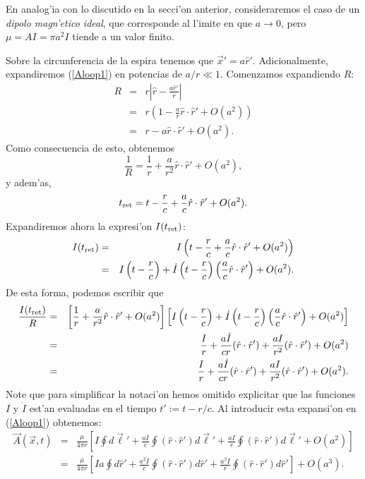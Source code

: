En analog'ia con lo discutido en la secci'on anterior, consideraremos el caso de un \textit{dipolo magn'etico ideal}, que corresponde al l'imite en que $a\to 0$, pero $\mu=AI=\pi a^2I$ tiende a un valor finito.

Sobre la circunferencia de la espira tenemos que $\vec{x}'=a\hat{r}'$. Adicionalmente, expandiremos (\ref{Aloop1}) en potencias de $a/r\ll 1$.  Comenzamos expandiendo $R$:
\begin{eqnarray}
 R&=&r\left|\hat{r}-\frac{a\hat{r}'}{r}\right| \\
&=&r\left(1-\frac{a}{r}\hat{r}\cdot\hat{r}'+O(a^2)\right) \\
&=& r-a\hat{r}\cdot\hat{r}'+O(a^2).
\end{eqnarray}
Como consecuencia de esto, obtenemos
\begin{equation}
 \frac{1}{R}=\frac{1}{r}+\frac{a}{r^2}\hat{r}\cdot\hat{r}'+O(a^2),
\end{equation}
y adem'as,
\begin{equation}
 t_{\rm ret}=t-\frac{r}{c}+\frac{a}{c}\hat{r}\cdot\hat{r}'+O(a^2).
\end{equation}
Expandiremos ahora la expresi'on $I(t_{\rm ret})$:
\begin{eqnarray}
 I(t_{\rm ret})
&=&I\left(t-\frac{r}{c}+\frac{a}{c}\hat{r}\cdot\hat{r}'+O(a^2)\right) \\
&=&I\left(t-\frac{r}{c}\right)+\dot{I}\left(t-\frac{r}{c}\right)\left(\frac{a}{c}\hat{r}\cdot\hat{r}'\right)+O(a^2).
\end{eqnarray}
De esta forma, podemos escribir que
\begin{eqnarray}
\frac{I(t_{\rm ret})}{R}
&=&\left[\frac{1}{r}+\frac{a}{r^2}\hat{r}\cdot\hat{r}'+O(a^2)\right]\left[I\left(t-\frac{r}{c}\right)+\dot{I}\left(t-\frac{r}{c}\right)\left(\frac{a}{c}\hat{r}\cdot\hat{r}'\right)+O(a^2)\right]\\
&=&\frac{I}{r}+\frac{a\dot{I}}{cr}(\hat{r}\cdot\hat{r}')+\frac{aI}{r^2}(\hat{r}\cdot\hat{r}')
+O(a^2)\\
&=&\frac{I}{r}+\frac{a\dot{I}}{cr}(\hat{r}\cdot\hat{r}')+\frac{aI}{r^2}(\hat{r}\cdot\hat{r}')+O(a^2).
\end{eqnarray}
Note que para simplificar la notaci'on hemos omitido explicitar que las funciones $I$ y $\dot{I}$ est'an evaluadas en el tiempo $t':=t-r/c$. Al introducir esta expansi'on en (\ref{Aloop1}) obtenemos:
\begin{eqnarray}
 \vec{A}(\vec{x},t)&=&\frac{\mu}{4\pi r}\left[I\oint d\vec{\ell}'
+\frac{a\dot{I}}{c}\oint(\hat{r}\cdot\hat{r}')d\vec{\ell}'+\frac{aI}{r}\oint(\hat{r}\cdot\hat{r}')d\vec{\ell}'+O(a^2)\right]  \\
&=&\frac{\mu}{4\pi r}\left[Ia\oint d\hat{r}'
+\frac{a^2\dot{I}}{c}\oint(\hat{r}\cdot\hat{r}')d\hat{r}'+\frac{a^2I}{r}\oint(\hat{r}\cdot\hat{r}')d\hat{r}'\right] +O(a^3).
\end{eqnarray}
